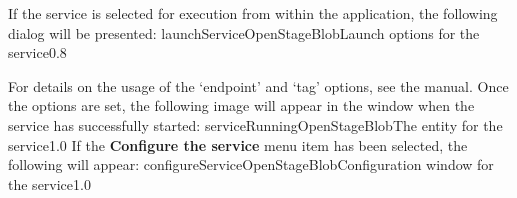 \insertStandardServiceCommands
\secondaryEnd
\condPage
{}
If the service is selected for execution from within the \emph{\MMMU}
application, the following dialog will be presented:
%
{launchServiceOpenStageBlob}{Launch options for the \emph{\OSBI} service}{0.8}

For details on the usage of the `endpoint' and `tag' options, see the \emph{\MMMU} manual.
Once the options are set, the following image will appear in the \emph{\MMMU} window when
the service has successfully started:
%
{serviceRunningOpenStageBlob}{The \emph{\MMMU} entity for the \emph{\OSBI} service}{1.0}
\condPage{}
If the \textbf{Configure the service} menu item has been selected, the following will
appear:
%
{configureServiceOpenStageBlob}{Configuration window for the \emph{\OSBI} service}{1.0}
\secondaryEnd
\primaryEnd{}

